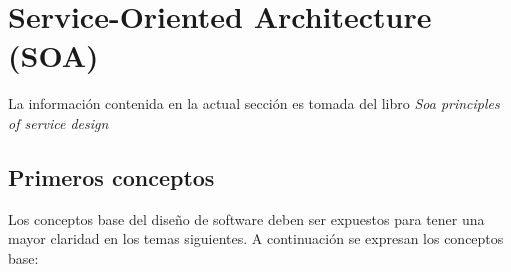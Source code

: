 

\section{Service-Oriented Architecture (SOA)}

La información contenida en la actual sección es tomada del libro \textit{Soa principles of service design} \cite{soa_principles}

\subsection{Primeros conceptos}

Los conceptos base del diseño de software deben ser expuestos para tener una mayor claridad en los temas siguientes. A continuación se expresan los conceptos base:


